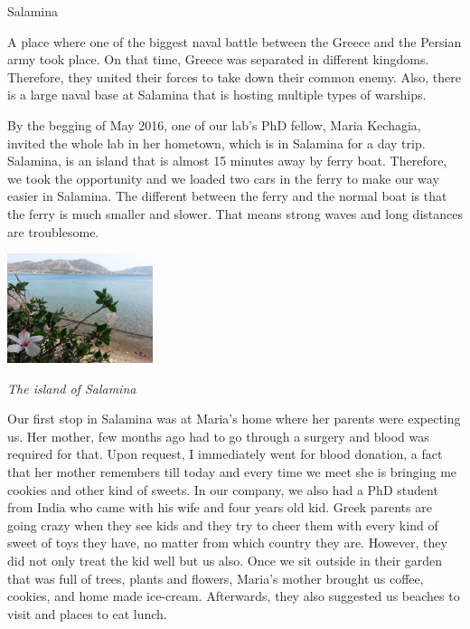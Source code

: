 \documentclass[10pt,a4paper]{article} %
\newcommand{\NewsItem}[1]{ %
\usefont{T1}{fvs}{n}{n} %
\vspace{24pt}\large #1\vspace{3pt} %
\par \normalsize \normalfont}
\begin{document}
\begin{multicols}{3}
\NewsItem{Salamina}

A place where one of the biggest naval battle between the Greece and the Persian 
army took place. 
On that time, Greece was separated in different kingdoms. 
Therefore, they united their forces to take down their common enemy. 
Also, there is a large naval base at Salamina that is hosting multiple types of 
warships.


By the begging of May 2016, one of our lab's PhD fellow, Maria Kechagia, invited 
the whole lab in her hometown, which is in Salamina for a day trip. 
Salamina, is an island that is almost 15 minutes away by ferry boat. 
Therefore, we took the opportunity and we loaded two cars in the ferry to make our 
way easier in Salamina. 
The different between the ferry and the normal boat is that the ferry is much 
smaller and slower. 
That means strong waves and long distances are troublesome.


\begin{center}
	\includegraphics[width=0.32\textwidth]{media/salamina_1.jpg}
	\par\textit{The island of Salamina}
\end{center}


Our first stop in Salamina was at Maria's home where her parents were expecting us. 
Her mother, few months ago had to go through a surgery and blood was required for 
that. 
Upon request, I immediately went for blood donation, a fact that her mother remembers 
till today and every time we meet she is bringing me cookies and other kind of sweets. 
In our company, we also had a PhD student from India who came with his wife and 
four years old kid. 
Greek parents are going crazy when they see kids and they try to cheer them with 
every kind of sweet of toys they have, no matter from which country they are. 
However, they did not only treat the kid well but us also. 
Once we sit outside in their garden that was full of trees, plants and flowers, 
Maria's mother brought us coffee, cookies, and home made ice-cream. 
Afterwards, they also suggested us beaches to visit and places to eat lunch.



\end{multicols}
\end{document}
